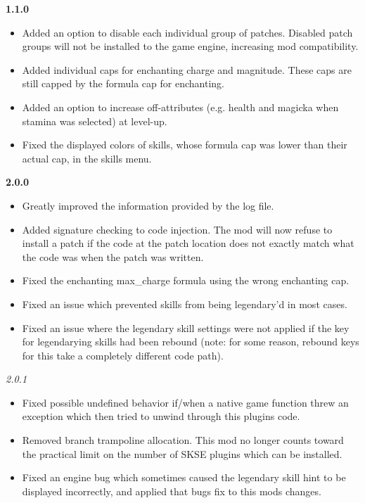 \documentclass[12pt]{amsart}
\begin{document}
\startblock
\textbf{1.1.0}
\begin{itemize}
    \item Added an option to disable each individual group of patches. Disabled
          patch groups will not be installed to the game engine, increasing mod
          compatibility.
    \item Added individual caps for enchanting charge and magnitude. These caps
          are still capped by the formula cap for enchanting.
    \item Added an option to increase off-attributes (e.g. health and magicka
          when stamina was selected) at level-up.
    \item Fixed the displayed colors of skills, whose formula cap was lower than
          their actual cap, in the skills menu.
\end{itemize}
\stopblock

\startblock
\textbf{2.0.0}
\begin{itemize}
    \item Greatly improved the information provided by the log file.
    \item Added signature checking to code injection. The mod will now refuse to
          install a patch if the code at the patch location does not exactly
          match what the code was when the patch was written.
    \item Fixed the enchanting max\_charge formula using the wrong enchanting
          cap.
    \item Fixed an issue which prevented skills from being legendary'd in most
          cases.
    \item Fixed an issue where the legendary skill settings were not applied if
          the key for legendarying skills had been rebound (note: for some
          reason, rebound keys for this take a completely different code path).
\end{itemize}
\stopblock

\startblock
\emph{2.0.1}
\begin{itemize}
    \item Fixed possible undefined behavior if/when a native game function threw
          an exception which then tried to unwind through this plugins code.
    \item Removed branch trampoline allocation. This mod no longer counts toward
          the practical limit on the number of SKSE plugins which can be
          installed.
    \item Fixed an engine bug which sometimes caused the legendary skill hint to
          be displayed incorrectly, and applied that bugs fix to this mods
          changes.
\end{itemize}
\stopblock
\end{document}
